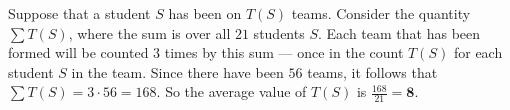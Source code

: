 Suppose that a student $S$ has been on $T(S)$ teams. Consider the quantity $\sum T(S)$, where the sum is over all $21$ students $S$. Each team that has been formed will be counted $3$ times by this sum --- once in the count $T(S)$ for each student $S$ in the team. Since there have been $56$ teams, it follows that $\sum T(S)=3\cdot56=168$. So the average value of $T(S)$ is $\frac{168}{21}=\mathbf{8}$.
